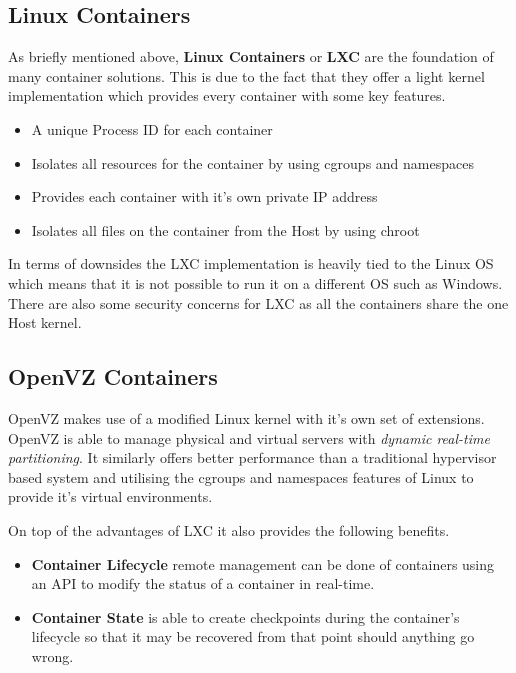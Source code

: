
\subsection{Linux Containers}

As briefly mentioned above, \textbf{Linux Containers} or \textbf{LXC} are the foundation of many container solutions. This is due to the fact that they offer a light kernel implementation which provides every container with some key features.

\begin{itemize}
    \item A unique Process ID for each container
    \item Isolates all resources for the container by using cgroups and namespaces
    \item Provides each container with it's own private IP address
    \item Isolates all files on the container from the Host by using chroot
\end{itemize}

In terms of downsides the LXC implementation is heavily tied to the Linux OS which means that it is not possible to run it on a different OS such as Windows. There are also some security concerns for LXC as all the containers share the one Host kernel.

\subsection{OpenVZ Containers}

OpenVZ makes use of a modified Linux kernel with it's own set of extensions. OpenVZ is able to manage physical and virtual servers with \textit{dynamic real-time partitioning}. It similarly offers better performance than a traditional hypervisor based system and utilising the cgroups and namespaces features of Linux to provide it's virtual environments.

On top of the advantages of LXC it also provides the following benefits.

\begin{itemize}
    \item \textbf{Container Lifecycle} remote management can be done of containers using an API to modify the status of a container in real-time. 
    \item \textbf{Container State} is able to create checkpoints during the container's lifecycle so that it may be recovered from that point should anything go wrong.
\end{itemize}

